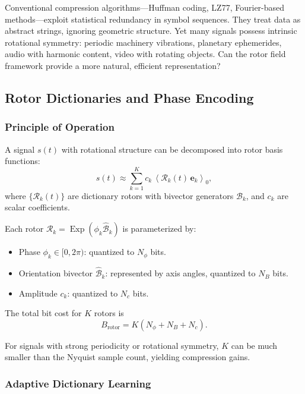 \documentclass[11pt,a4paper]{article}
\newcommand{\grade}[2]{\left\langle #1 \right\rangle_{#2}}
\newcommand{\scal}[1]{\grade{#1}{0}}
\newcommand{\Exp}{\operatorname{Exp}}
\newcommand{\Rotor}{\mathcal{R}}
\newcommand{\Biv}{\mathcal{B}}
\theoremstyle{definition}
\theoremstyle{plain}
\theoremstyle{remark}
\begin{document}
Conventional compression algorithms---Huffman coding, LZ77, Fourier-based methods---exploit statistical redundancy in symbol sequences. They treat data as abstract strings, ignoring geometric structure. Yet many signals possess intrinsic rotational symmetry: periodic machinery vibrations, planetary ephemerides, audio with harmonic content, video with rotating objects. Can the rotor field framework provide a more natural, efficient representation?

\subsection{Rotor Dictionaries and Phase Encoding}

\subsubsection{Principle of Operation}

A signal $s(t)$ with rotational structure can be decomposed into rotor basis functions:
\begin{equation}
s(t) \approx \sum_{k=1}^K c_k \,\scal{\Rotor_k(t)\, \mathbf{e}_k},
\end{equation}
where $\{\Rotor_k(t)\}$ are dictionary rotors with bivector generators $\Biv_k$, and $c_k$ are scalar coefficients.

Each rotor $\Rotor_k = \Exp(\phi_k \hat{\Biv}_k)$ is parameterized by:
\begin{itemize}
  \item Phase $\phi_k \in [0, 2\pi)$: quantized to $N_\phi$ bits.
  \item Orientation bivector $\hat{\Biv}_k$: represented by axis angles, quantized to $N_B$ bits.
  \item Amplitude $c_k$: quantized to $N_c$ bits.
\end{itemize}

The total bit cost for $K$ rotors is
\begin{equation}
B_{\text{rotor}} = K(N_\phi + N_B + N_c).
\end{equation}

For signals with strong periodicity or rotational symmetry, $K$ can be much smaller than the Nyquist sample count, yielding compression gains.

\subsubsection{Adaptive Dictionary Learning}
\end{document}
